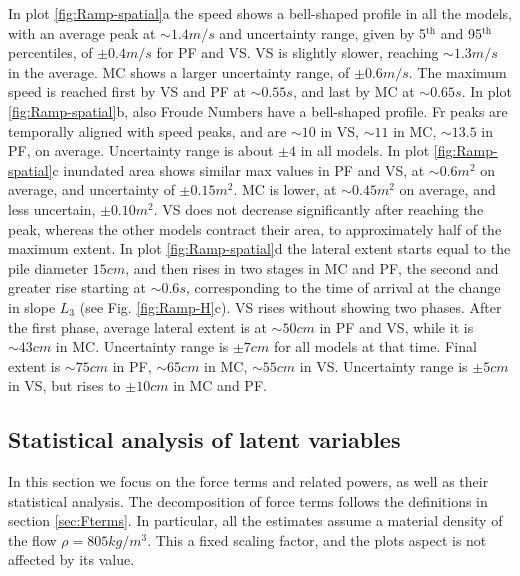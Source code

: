 \documentclass{article}
\begin{document}
In plot \ref{fig:Ramp-spatial}a the speed shows a bell-shaped profile in all the models, with an average peak at $\sim 1.4 m/s$ and uncertainty range, given by 5$^{\mathrm{th}}$ and 95$^{\mathrm{th}}$ percentiles, of $\pm 0.4 m/s$ for PF and VS. VS is slightly slower, reaching $\sim 1.3 m/s$ in the average. MC shows a larger uncertainty range, of $\pm 0.6 m/s$. The maximum speed is reached first by VS and PF at $\sim 0.55 s$, and last by MC at $\sim 0.65 s$. In plot \ref{fig:Ramp-spatial}b, also Froude Numbers have a bell-shaped profile. Fr peaks are temporally aligned with speed peaks, and are $\sim 10$ in VS, $\sim 11$ in MC, $\sim 13.5$ in PF, on average. Uncertainty range is about $\pm 4$ in all models. In plot \ref{fig:Ramp-spatial}c inundated area shows similar max values in PF and VS, at $\sim 0.6 m^2$ on average, and uncertainty of $\pm 0.15 m^2$. MC is lower, at $\sim 0.45 m^2$ on average, and less uncertain, $\pm 0.10 m^2$. VS does not decrease significantly after reaching the peak, whereas the other models contract their area, to approximately half of the maximum extent. In plot \ref{fig:Ramp-spatial}d the lateral extent starts equal to the pile diameter $15 cm$, and then rises in two stages in MC and PF, the second and greater rise starting at $\sim 0.6 s$, corresponding to the time of arrival at the change in slope $L_3$ (see Fig. \ref{fig:Ramp-H}c). VS rises without showing two phases. After the first phase, average lateral extent is at $\sim 50 cm$ in PF and VS, while it is $\sim 43 cm$ in MC. Uncertainty range is $\pm 7 cm$ for all models at that time. Final extent is $\sim 75 cm$ in PF, $\sim 65 cm$ in MC, $\sim 55 cm$ in VS. Uncertainty range is $\pm 5 cm$ in VS, but rises to $\pm 10 cm$ in MC and PF.

\subsection{Statistical analysis of latent variables}\label{Hq1}
In this section we focus on the force terms and related powers, as well as their statistical analysis. The decomposition of force terms follows the definitions in section \ref{sec:Fterms}. In particular, all the estimates assume a material density of the flow $\rho = 805 kg/m^3$. This a fixed scaling factor, and the plots aspect is not affected by its value.
\end{document}
